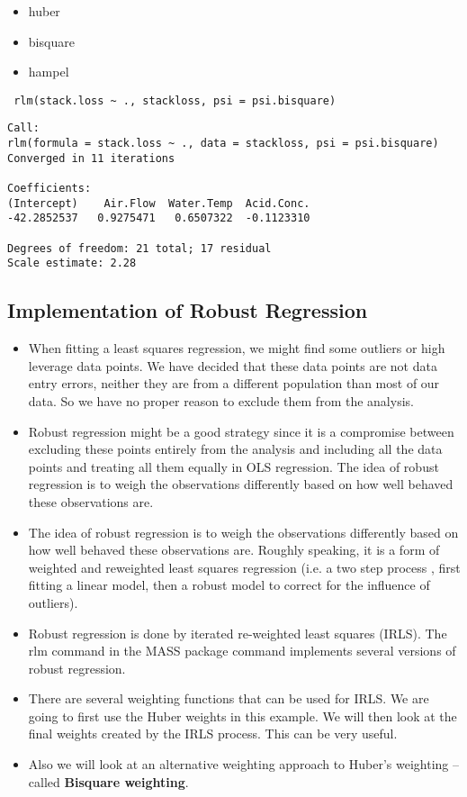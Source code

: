 \documentclass[main.tex]{subfiles}
\begin{document}
\begin{itemize}
\item huber
\item bisquare
\item hampel

\end{itemize}

\begin{framed}
\begin{verbatim}
 rlm(stack.loss ~ ., stackloss, psi = psi.bisquare)
\end{verbatim}
\end{framed}
\begin{verbatim}
Call:
rlm(formula = stack.loss ~ ., data = stackloss, psi = psi.bisquare)
Converged in 11 iterations

Coefficients:
(Intercept)    Air.Flow  Water.Temp  Acid.Conc. 
-42.2852537   0.9275471   0.6507322  -0.1123310 

Degrees of freedom: 21 total; 17 residual
Scale estimate: 2.28 
\end{verbatim}


\subsection{Implementation of Robust Regression}
\begin{itemize}
\item When fitting a least squares regression, we might find some outliers or high leverage data points.  We have decided that these data points are not data entry errors, neither they are from a different population than most of our data. So we have no proper reason to exclude them from the analysis.  

\item Robust regression might be a good strategy since it is a compromise between excluding these points entirely from the analysis and including all the data points and treating all them equally in OLS regression. The idea of robust regression is to weigh the observations differently based on how well behaved these observations are.

\item 
The idea of robust regression is to weigh the observations differently based on how well behaved these observations are. Roughly speaking, it is a form of weighted and reweighted least squares regression (i.e. a two step process , first fitting a linear model, then a robust model to correct for the influence of outliers).
\item 
Robust regression is done by iterated re-weighted least squares (IRLS). The rlm command in the MASS package command implements several versions of robust regression.
\item 
There are several weighting functions that can be used for IRLS. We are going to first use the Huber weights in this example. We will then look at the final weights created by the IRLS process. This can be very useful. 
\item 
Also we will look at an alternative weighting approach to Huber’s weighting – called \textbf{Bisquare weighting}. 
\end{itemize}
\end{document}
